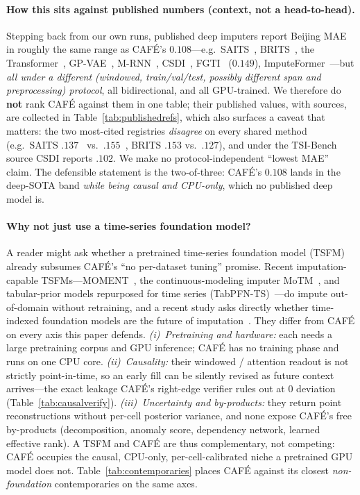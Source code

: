 \documentclass[10pt,twocolumn]{article}
\newcommand{\cafe}{CAF\'E}
\begin{document}
\paragraph{How this sits against published numbers (context, not a head-to-head).}
Stepping back from our own runs, published deep imputers report Beijing MAE in
roughly the same range as \cafe{}'s $0.108$---e.g.\ SAITS~\cite{du2023},
BRITS~\cite{cao2018}, the Transformer~\cite{vaswani2017}, GP-VAE~\cite{fortuin2020},
M-RNN~\cite{yoon2019}, CSDI~\cite{tashiro2021}, FGTI~\cite{fgti2024} ($0.149$),
ImputeFormer~\cite{nie2024imputeformer}---but \emph{all under a different (windowed,
train/val/test, possibly different span and preprocessing) protocol}, all
bidirectional, and all GPU-trained. We therefore do \textbf{not} rank \cafe{}
against them in one table; their published values, with sources, are collected in
Table~\ref{tab:publishedrefs}, which also surfaces a caveat that matters: the two
most-cited registries \emph{disagree} on every shared method (e.g.\ SAITS
$.137$~\cite{du2023} vs.\ $.155$~\cite{du2024tsibench}, BRITS $.153$ vs.\ $.127$),
and under the TSI-Bench~\cite{du2024tsibench} source CSDI reports $.102$. We make no
protocol-independent ``lowest MAE'' claim. The defensible statement is the
two-of-three: \cafe{}'s $0.108$ lands in the deep-SOTA band \emph{while being causal
and CPU-only}, which no published deep model is.


\paragraph{Why not just use a time-series foundation model?} A reader might ask
whether a pretrained time-series foundation model (TSFM) already subsumes \cafe{}'s
``no per-dataset tuning'' promise. Recent imputation-capable TSFMs---MOMENT~\cite{goswami2024moment},
the continuous-modeling imputer MoTM~\cite{fons2025motm}, and tabular-prior models
repurposed for time series (TabPFN-TS)~\cite{hoo2025tabpfnts}---do impute
out-of-domain without retraining, and a recent study asks directly whether
time-indexed foundation models are the future of imputation~\cite{leroy2025timeindexed}.
They differ from \cafe{} on every axis this paper defends. \emph{(i)~Pretraining and
hardware:} each needs a large pretraining corpus and GPU inference; \cafe{} has no
training phase and runs on one CPU core. \emph{(ii)~Causality:} their windowed /
attention readout is not strictly point-in-time, so an early fill can be silently
revised as future context arrives---the exact leakage \cafe{}'s right-edge verifier
rules out at $0$ deviation (Table~\ref{tab:causalverify}). \emph{(iii)~Uncertainty and
by-products:} they return point reconstructions without per-cell posterior variance,
and none expose \cafe{}'s free by-products (decomposition, anomaly score, dependency
network, learned effective rank). A TSFM and \cafe{} are thus complementary, not
competing: \cafe{} occupies the causal, CPU-only, per-cell-calibrated niche a
pretrained GPU model does not. Table~\ref{tab:contemporaries} places \cafe{} against
its closest \emph{non-foundation} contemporaries on the same axes.

\end{document}

